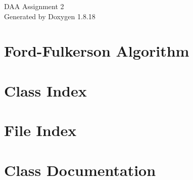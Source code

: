 \let\mypdfximage\pdfximage\def\pdfximage{\immediate\mypdfximage}\documentclass[twoside]{book}
\newcommand{\+}{\discretionary{\mbox{\scriptsize$\hookleftarrow$}}{}{}}
\newcommand{\clearemptydoublepage}{%
  \newpage{\pagestyle{empty}\cleardoublepage}%
}
\begin{document}
\hypersetup{pageanchor=false,
             bookmarksnumbered=true,
             pdfencoding=unicode
            }
\begin{titlepage}
\vspace*{7cm}
\begin{center}%
{\Large D\+AA Assignment 2 }\\
\vspace*{1cm}
{\large Generated by Doxygen 1.8.18}\\
\end{center}
\end{titlepage}
\clearemptydoublepage
{}
\tableofcontents
\clearemptydoublepage
{}
\hypersetup{pageanchor=true}

\chapter{Ford-\/\+Fulkerson Algorithm}
\label{md__r_e_a_d_m_e}

\chapter{Class Index}

\chapter{File Index}

\chapter{Class Documentation}

\end{document}

